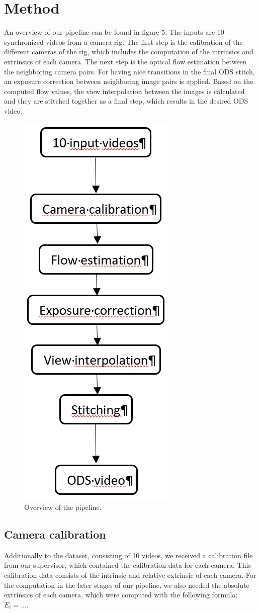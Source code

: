 \documentclass[10pt,twocolumn,letterpaper]{article}
\begin{document}
\section{Method}
An overview of our pipeline can be found in figure 5. The inputs are 10 synchronized videos from a camera rig. The first step is the calibration of the different cameras of the rig, which includes the computation of the intrinsics and extrinsics of each camera. The next step is the optical flow estimation between the neighboring camera pairs. For having nice transitions in the final ODS stitch, an exposure correction between neighboring image pairs is applied. Based on the computed flow values, the view interpolation between the images is calculated and they are stitched together as a final step, which results in the desired ODS video.

\begin{figure}[t]
\begin{center}
   \includegraphics[width=0.3\linewidth]{pictures/pipeline.png}
\end{center}
   \caption{Overview of the pipeline.}
\label{fig:long}
\label{fig:onecol}
\end{figure}

\subsection{Camera calibration}
Additionally to the dataset, consisting of 10 videos, we received a calibration file from our supervisor, which contained the calibration data for each camera. This calibration data consists of the intrinsic and relative extrinsic of each camera. For the computation in the later stages of our pipeline, we also needed the absolute extrinsics of each camera, which were computed with the following formula:
$E_i=....$
\end{document}
